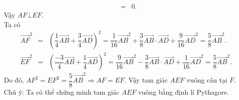 \begin{ex}
{\begin{itemchoice}
\begin{eqnarray*}
				&=&0.
			\end{eqnarray*}
			Vậy $ AF\bot EF$. \\
			Ta có \begin{eqnarray*}
				\overrightarrow{A F}^2&=&\left(\dfrac{1}{4} \overrightarrow{A B}+\dfrac{3}{4} \overrightarrow{A D}\right)^2=\dfrac 1{16} \overrightarrow{A B}^2+\dfrac{3}{8} \overrightarrow{A B} \cdot \overrightarrow{A D}+\dfrac 9{16} \overrightarrow{A D}^2=\dfrac{5}{8} \overrightarrow{A B}^2.\\
				\overrightarrow{EF}^2&=&{{\left( \dfrac{-3} 4\overrightarrow{AB}+\dfrac{1}{4}\overrightarrow{AD} \right)}^2}=\dfrac 9{16}{{\overrightarrow{AB}}^2}-\dfrac{3}{8}\overrightarrow{AB}\cdot \overrightarrow{AD}+\dfrac 1{16}{{\overrightarrow{AD}}^2}=\dfrac{5}{8}{\overrightarrow{AB}}^2.
			\end{eqnarray*}
			Do đó, $A F^2=E F^2=\dfrac{5}{8} \overrightarrow{A B}^2 \Rightarrow A F=E F$. Vậy tam giác ${A E F}$ vuông cân tại ${F}$.\\
			Chú ý: Ta có thể chứng minh tam giác ${A E F}$ vuông bằng định lí Pythagore.
		\end{itemchoice}
	}
\end{ex}

